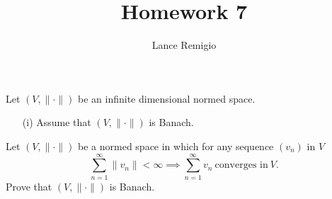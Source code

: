 \documentclass[a4paper]{article}
\title{Homework 7}
\author{Lance Remigio}
\begin{document}
\maketitle

\begin{problem}
    Let \( (V, \|\cdot\|) \) be an infinite dimensional normed space.
\end{problem}

\begin{enumerate}
    \item[(i)] Assume that \( (V, \|\cdot\|) \) is Banach.
\end{enumerate}


\begin{problem}
   Let \( (V, \|\cdot\|) \) be a normed space in which for any sequence \( ({v}_{n}) \) in \( V  \)  
   \[  \sum_{ n=1  }^{ \infty  } \|{v}_{n}\| < \infty \implies \sum_{ n=1  }^{ \infty  } {v}_{n} \ \text{converges in} \ V.  \]
   Prove that \( (V , \|\cdot\|) \) is Banach.
\end{problem}
\end{document}
